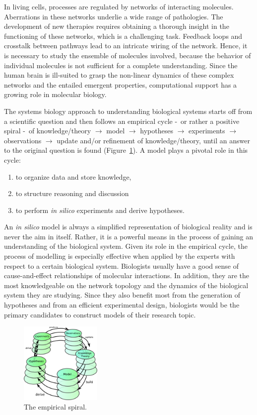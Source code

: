 In living cells, processes are regulated by networks of interacting molecules.
Aberrations in these networks underlie a wide range of pathologies. The development of new therapies
requires obtaining a thorough insight in the functioning of these networks, which is a challenging task.
Feedback loops and crosstalk between pathways lead to an intricate wiring of the network.
Hence, it is necessary to study the ensemble of molecules involved, because the 
behavior of individual molecules is not sufficient for a complete understanding. 
Since the human brain is ill-suited to grasp the non-linear dynamics of these complex networks and
the entailed emergent properties, computational support has a growing role 
in molecular biology.

The systems biology approach to understanding biological systems starts off from a
scientific question and then follows an empirical cycle \--\ or rather a positive spiral \--\ of
knowledge/theory $\rightarrow$ model $\rightarrow$ hypotheses $\rightarrow$ experiments $\rightarrow$
observations $\rightarrow$ update and/or refinement of knowledge/theory,
until an answer to the original question is found (Figure~\ref{fig:empirical-spiral}).
A model plays a pivotal role in this cycle:
\begin{enumerate}
  \item to organize data and store knowledge,
  \item to structure reasoning and discussion
  \item to perform \emph{in silico} experiments and derive hypotheses.
\end{enumerate}
An \emph{in silico} model is always a simplified representation of biological reality and is never the 
aim in itself.
Rather, it is a powerful means in the process of gaining an understanding of the biological system.
Given its role in the empirical cycle, the process of modelling is especially effective
when applied by the experts with respect to a certain biological system. Biologists usually have a good sense 
of cause-and-effect relationships of molecular interactions. In addition, they are the most knowledgeable
on the network topology and the dynamics of the biological system they are studying.
Since they also benefit most from the generation of hypotheses and from an efficient experimental design, 
biologists would be the primary candidates to construct models of their research topic.

\begin{figure}[!htb]
  \centering
  \includegraphics[width=0.35\textwidth]{images/empirical_spiral4}
 \caption{The empirical spiral.}\label{fig:empirical-spiral}
\end{figure}


